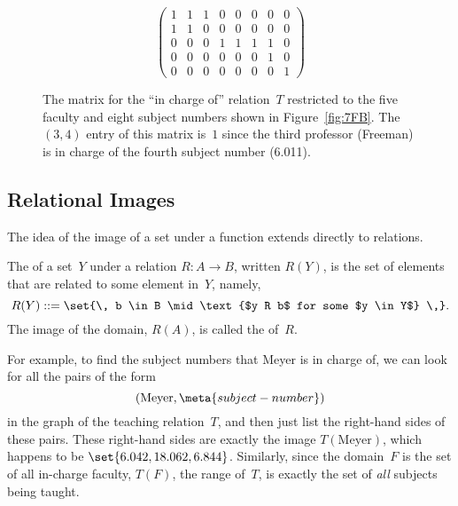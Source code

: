 \begin{figure}\redrawntrue

\begin{equation*}
\begin{pmatrix}
    1 & 1 & 1 & 0 & 0 & 0 & 0 & 0 \\
    1 & 1 & 0 & 0 & 0 & 0 & 0 & 0 \\
    0 & 0 & 0 & 1 & 1 & 1 & 1 & 0 \\
    0 & 0 & 0 & 0 & 0 & 0 & 1 & 0 \\
    0 & 0 & 0 & 0 & 0 & 0 & 0 & 1
\end{pmatrix}
\end{equation*}

\caption{The matrix for the ``in charge of'' relation~$T$ restricted
  to the five faculty and eight subject numbers shown in
  Figure~\ref{fig:7FB}.  The $(3,4)$ entry of this matrix is~$1$ since
  the third professor (Freeman) is in charge of the fourth subject
  number (6.011).}

\label{fig:7FC}

\end{figure}

\subsection{Relational Images}

The idea of the image of a set under a function extends directly to
relations.

\begin{definition}
The  of a set~$Y$ under a relation $R: A \to B$, written
$R(Y)$, is the set of elements that are related to some element
in~$Y$, namely,
\begin{equation*}
    R(Y) ::= \set{\, b \in B \mid \text{$y R b$ for some $y \in Y$} \,}.
\end{equation*}
The image of the domain, $R(A)$, is called the  of~$R$.
\end{definition}

For example, to find the subject numbers that Meyer is in charge of,
we can look for all the pairs of the form
\begin{equation*}
    (\text{Meyer}, \meta{subject-number})
\end{equation*}
in the graph of the teaching relation~$T$, and then just list the
right-hand sides of these pairs.  These right-hand sides are exactly
the image $T(\text{Meyer})$, which happens to be $\set{6.042, 18.062,
  6.844}$.  Similarly, since the domain~$F$ is the set of all
in-charge faculty, $T(F)$, the range of~$T$, is exactly the set of
\emph{all} subjects being taught.

